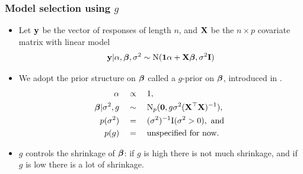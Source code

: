 \documentclass{beamer}
\begin{document}
 

\begin{frame}
	\frametitle{Model selection using $g$}
	\begin{itemize}
		\item 	 Let ${\bf y}$ be the vector of responses of length $n$, and ${\bf X}$ be the $n \times p$ covariate matrix with linear model		
			\begin{align*}
	{\bf y} | \alpha, {\boldsymbol \beta}, \sigma^2 \sim \text{N}({\bf 1} \alpha + {\bf X} {\boldsymbol \beta}, \sigma^2 {\bf I}) 
	\end{align*}	
		
		\item We adopt the prior structure on ${\boldsymbol \beta}$ called a $g$-prior on ${\boldsymbol \beta}$, introduced in
		\cite{Zellner1986}.
		\begin{align*}
			\alpha \quad & \propto \quad 1, \\
			{\boldsymbol \beta} | \sigma^2, g \quad & \sim \quad \text{N}_p({\bf 0}, g \sigma^2 ({\bf X}^\top {\bf X})^{-1}),                     \\
			p(\sigma^2)          \quad & = \quad (\sigma^2)^{-1} \text{I}(\sigma^2 > 0), \text{ and }                    \\
			p(g)                 \quad & = \quad \text{unspecified for now}.
		\end{align*}
		\item $g$ controls the shrinkage of ${\boldsymbol \beta}$: if $g$ is high there is not much shrinkage,
					and if $g$ is low there is a lot of shrinkage.
	\end{itemize}
\end{frame}

\end{document}
